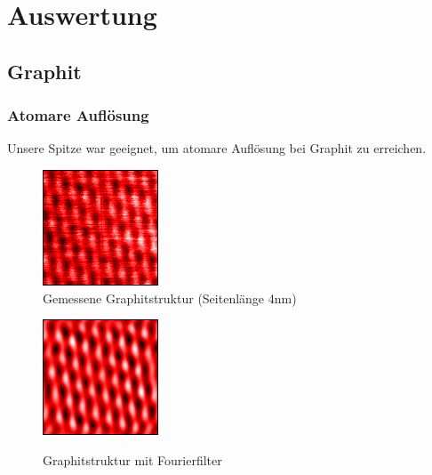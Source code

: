 \section{Auswertung}
\subsection{Graphit}


\subsubsection{Atomare Auflösung}
Unsere Spitze war geeignet, um atomare Auflösung bei Graphit zu erreichen.
\begin{figure}
\centering
\includegraphics[scale=1]{data/graphit/raw.png}
\caption{Gemessene Graphitstruktur (Seitenlänge 4nm)}
\label{fig:raw}
\end{figure}
\begin{figure}
\centering
\includegraphics[scale=1]{data/graphit/2nm_edit2.png}
\label{fig:edit}
\caption{Graphitstruktur mit Fourierfilter}
\end{figure}

